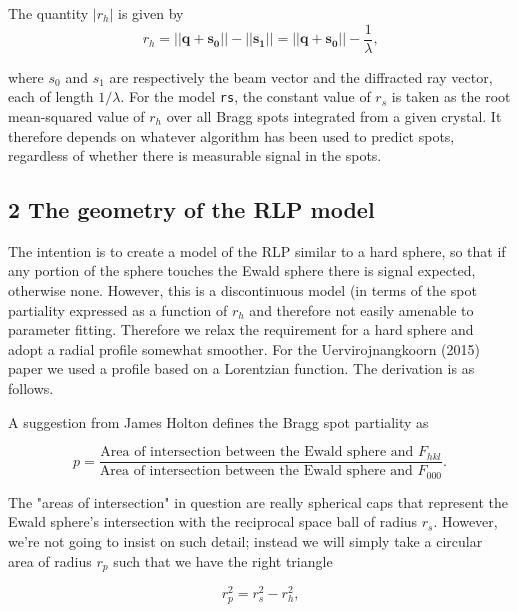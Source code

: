 \documentclass[12pt, letterpaper]{article}
\begin{document}
  The quantity $|{r_h}|$ is given by 
    \begin{equation}
    {r_h} = ||\mathbf{q}+\mathbf{s_0}||-||\mathbf{s_1}|| = ||\mathbf{q}+\mathbf{s_0}||-\dfrac{1}{ \lambda}
    \text{,}
    \label{eqn:Rh}
  \end{equation}

  where ${s_0}$ and ${s_1}$ are respectively the beam vector and the diffracted ray vector,
  each of length $1/\lambda$.  For the model {\tt rs}, the constant value of ${r_s}$ is taken 
  as the root mean-squared value of
  ${r_h}$ over all Bragg spots integrated from a given crystal.  It therefore depends on whatever
  algorithm has been used to predict spots, regardless of whether there is measurable signal
  in the spots.  
  \subsection*{2 The geometry of the RLP model}

  \par The intention is to create a model of the RLP similar to a hard sphere, so that if any portion 
  of the sphere touches the Ewald sphere there is signal expected, otherwise none.  However, this 
  is a discontinuous model (in terms of the spot partiality expressed as a function of ${r_h}$ and
  therefore not easily amenable to parameter fitting.  Therefore we relax the requirement for a hard
  sphere and adopt a radial profile somewhat smoother.  For the Uervirojnangkoorn (2015) paper
  we used a profile based on a Lorentzian function.  The derivation is as follows.  
  
\par A suggestion from James Holton defines the Bragg spot partiality as
  
  \begin{equation}
    p = \frac{\text{Area of intersection between the Ewald sphere and } F_{hkl}}
             {\text{Area of intersection between the Ewald sphere and } F_{000}}
    \text{.}
    \label{eqn:part}
  \end{equation}
  
The "areas of intersection" in question are really spherical caps that represent the Ewald 
sphere's intersection with the reciprocal space ball of radius $r_s$.  However, we're not going to 
insist on such detail; instead we will simply take a circular area of radius $r_p$ such that we
have the right triangle

  \begin{equation}
    {r}_p^2 = {r}_s^2 - {r}_h^2
    \text{,}
    \label{eqn:pyth}
  \end{equation}
\end{document}
